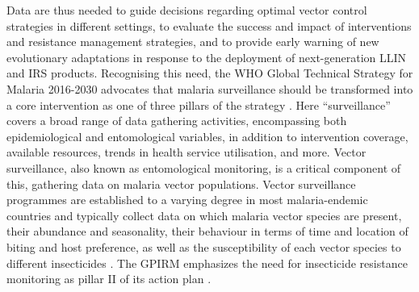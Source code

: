 \documentclass[a4paper,11pt,abstracton,hidelinks]{scrartcl}
\begin{document}
Data are thus needed to guide decisions regarding optimal vector control strategies in different settings, to evaluate the success and impact of interventions and resistance management strategies, and to provide early warning of new evolutionary adaptations in response to the deployment of next-generation LLIN and IRS products.
%
Recognising this need, the WHO Global Technical Strategy for Malaria 2016-2030 advocates that malaria surveillance should be transformed into a core intervention as one of three pillars of the strategy \citep{WHO2015GTS}.
%
Here ``surveillance'' covers a broad range of data gathering activities, encompassing both epidemiological and entomological variables, in addition to intervention coverage, available resources, trends in health service utilisation, and more. 
%
Vector surveillance, also known as entomological monitoring, is a critical component of this, gathering data on malaria vector populations.
%
Vector surveillance programmes are established to a varying degree in most malaria-endemic countries and typically collect data on which malaria vector species are present, their abundance and seasonality, their behaviour in terms of time and location of biting and host preference, as well as the susceptibility of each vector species to different insecticides \citep{Russell2020}.
%
The GPIRM emphasizes the need for insecticide resistance monitoring as pillar \RN{2} of its action plan \citep{WHO2012GPIRM}.
\end{document}
